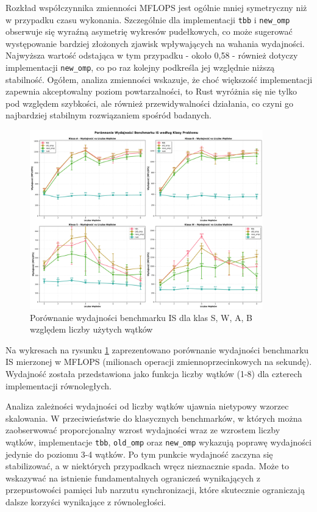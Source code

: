 Rozkład współczynnika zmienności MFLOPS jest ogólnie mniej symetryczny niż w przypadku czasu wykonania. Szczególnie dla implementacji \texttt{tbb} i \texttt{new\_omp} obserwuje się wyraźną asymetrię wykresów pudełkowych, co może sugerować występowanie bardziej złożonych zjawisk wpływających na wahania wydajności. Najwyższa wartość odstająca w tym przypadku - około 0,58 - również dotyczy implementacji \texttt{new\_omp}, co po raz kolejny podkreśla jej względnie niższą stabilność. Ogółem, analiza zmienności wskazuje, że choć większość implementacji zapewnia akceptowalny poziom powtarzalności, to Rust wyróżnia się nie tylko pod względem szybkości, ale również przewidywalności działania, co czyni go najbardziej stabilnym rozwiązaniem spośród badanych.
\begin{figure}[H]
    \centering
    \includegraphics[width=0.9\textwidth]{analiza/images/parallel/is/arm/is_porownanie_wydajnosci.png}
    \caption{Porównanie wydajności benchmarku IS dla klas S, W, A, B względem liczby użytych wątków}
    \label{is_porownanie_wydajnosci}
\end{figure}
Na wykresach na rysunku \ref{is_porownanie_wydajnosci} zaprezentowano porównanie wydajności benchmarku IS mierzonej w MFLOPS (milionach operacji zmiennoprzecinkowych na sekundę). Wydajność została przedstawiona jako funkcja liczby wątków (1-8) dla czterech implementacji równoległych.

Analiza zależności wydajności od liczby wątków ujawnia nietypowy wzorzec skalowania. W przeciwieństwie do klasycznych benchmarków, w których można zaobserwować proporcjonalny wzrost wydajności wraz ze wzrostem liczby wątków, implementacje \texttt{tbb}, \texttt{old\_omp} oraz \texttt{new\_omp} wykazują poprawę wydajności jedynie do poziomu 3-4 wątków. Po tym punkcie wydajność zaczyna się stabilizować, a w niektórych przypadkach wręcz nieznacznie spada. Może to wskazywać na istnienie fundamentalnych ograniczeń wynikających z przepustowości pamięci lub narzutu synchronizacji, które skutecznie ograniczają dalsze korzyści wynikające z równoległości.

